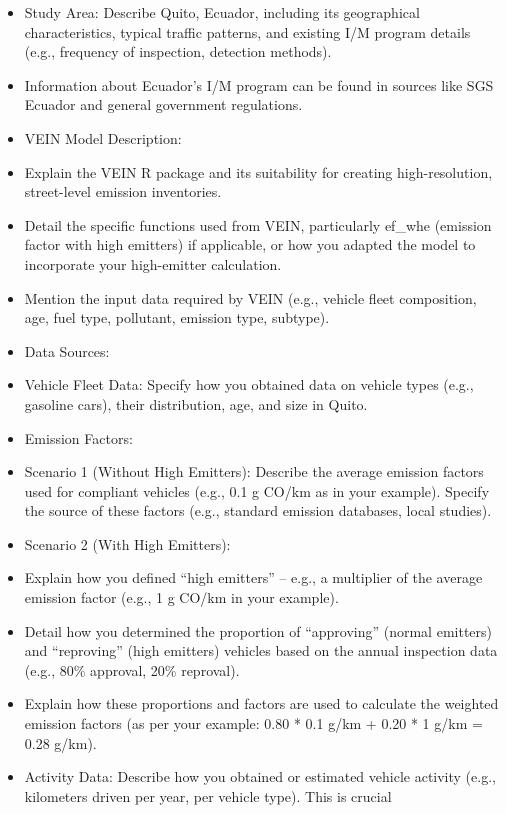 \documentclass[atmosphere,article,submit,moreauthors,pdftex]{Definitions/mdpi}
\providecommand{\tightlist}{%
  \setlength{\itemsep}{0pt}\setlength{\parskip}{0pt}}
\begin{document}
\begin{itemize}
\tightlist
\item
  Study Area: Describe Quito, Ecuador, including its geographical
  characteristics, typical traffic patterns, and existing I/M program
  details (e.g., frequency of inspection, detection methods).
\item
  Information about Ecuador's I/M program can be found in sources like
  SGS Ecuador and general government regulations.
\item
  VEIN Model Description:
\item
  Explain the VEIN R package and its suitability for creating
  high-resolution, street-level emission inventories.
\item
  Detail the specific functions used from VEIN, particularly ef\_whe
  (emission factor with high emitters) if applicable, or how you adapted
  the model to incorporate your high-emitter calculation.
\item
  Mention the input data required by VEIN (e.g., vehicle fleet
  composition, age, fuel type, pollutant, emission type, subtype).
\item
  Data Sources:
\item
  Vehicle Fleet Data: Specify how you obtained data on vehicle types
  (e.g., gasoline cars), their distribution, age, and size in Quito.
\item
  Emission Factors:
\item
  Scenario 1 (Without High Emitters): Describe the average emission
  factors used for compliant vehicles (e.g., 0.1 g CO/km as in your
  example). Specify the source of these factors (e.g., standard emission
  databases, local studies).
\item
  Scenario 2 (With High Emitters):
\item
  Explain how you defined ``high emitters'' -- e.g., a multiplier of the
  average emission factor (e.g., 1 g CO/km in your example).
\item
  Detail how you determined the proportion of ``approving'' (normal
  emitters) and ``reproving'' (high emitters) vehicles based on the
  annual inspection data (e.g., 80\% approval, 20\% reproval).
\item
  Explain how these proportions and factors are used to calculate the
  weighted emission factors (as per your example: 0.80 * 0.1 g/km + 0.20
  * 1 g/km = 0.28 g/km).
\item
  Activity Data: Describe how you obtained or estimated vehicle activity
  (e.g., kilometers driven per year, per vehicle type). This is crucial

\end{itemize}
\end{document}
